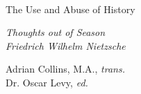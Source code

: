\begin{titlepage}
    \,
    \vspace{2cm}
    \begin{flushright}
        \begingroup
            \Huge
            {The Use and Abuse of History} \\ \bigskip
        \endgroup
        
        \vspace{0.5cm}
        
        \begingroup
        \large
        \textit{Thoughts out of Season}    \\
        \endgroup     
            \vspace{1.5cm}  
         \begingroup  
         \Huge
            \textit{Friedrich Wilhelm Nietzsche}
        \endgroup

        \vspace{1cm}  
        
        \begingroup
        \small
        

        Adrian Collins, M.A., \textit{trans.}\\
        Dr. Oscar Levy, \textit{ed.}\\
        \endgroup


    \end{flushright}
\end{titlepage}
